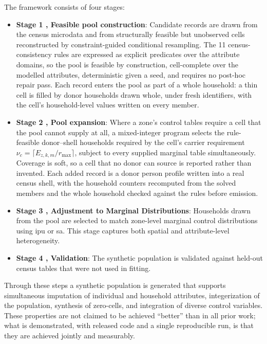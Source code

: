 ﻿\documentclass[../main.tex]{subfiles}
\begin{document}
The framework consists of four stages:
\begin{itemize}
\item \textbf{Stage 1 ,  Feasible pool construction}: Candidate records are drawn from the census microdata and from structurally feasible but unobserved cells reconstructed by constraint-guided conditional resampling. The 11 census-consistency rules are expressed as explicit predicates over the attribute domains, so the pool is feasible by construction, cell-complete over the modelled attributes, deterministic given a seed, and requires no post-hoc repair pass. Each record enters the pool as part of a whole household: a thin cell is filled by donor households drawn whole, under fresh identifiers, with the cell's household-level values written on every member.

\item \textbf{Stage 2 ,  Pool expansion}: Where a zone's control tables require a cell that the pool cannot supply at all, a mixed-integer program selects the rule-feasible donor--shell households required by the cell's carrier requirement $\nu_c=\lceil E_{z,k,m}/r_{\max}\rceil$, subject to every supplied marginal table simultaneously. Coverage is soft, so a cell that no donor can source is reported rather than invented. Each added record is a donor person profile written into a real census shell, with the household counters recomputed from the solved members and the whole household checked against the rules before emission.

\item \textbf{Stage 3 ,  Adjustment to Marginal Distributions}: Households drawn from the pool are selected to match zone-level marginal control distributions using \gls{ipu} or \gls{sa}. This stage captures both spatial and attribute-level heterogeneity.

\item \textbf{Stage 4 ,  Validation}: The synthetic population is validated against held-out census tables that were not used in fitting.
\end{itemize}

Through these steps a synthetic population is generated that supports simultaneous imputation of individual and household attributes, integerization of the population, synthesis of zero-cells, and integration of diverse control variables. These properties are not claimed to be achieved ``better'' than in all prior work; what is demonstrated, with released code and a single reproducible run, is that they are achieved jointly and measurably.
\end{document}

